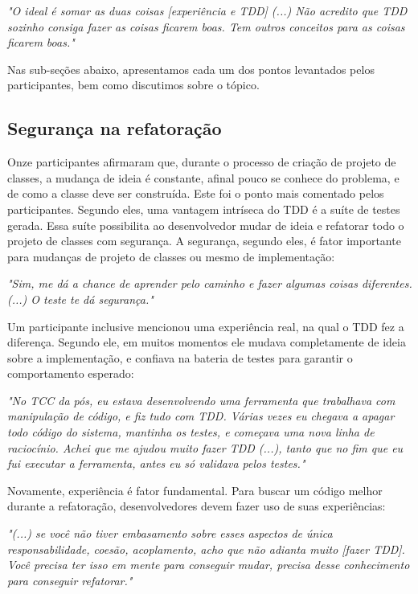 \begin{framed}
\textit{"O ideal é somar as duas coisas [experiência e TDD] (...) 
Não acredito que TDD sozinho consiga fazer as coisas ficarem boas. Tem outros conceitos
para as coisas ficarem boas."}
\end{framed}

Nas sub-seções abaixo, apresentamos cada um dos pontos 
levantados pelos participantes, bem como discutimos sobre o tópico.

\subsection{Segurança na refatoração}

Onze participantes afirmaram que, durante o processo de criação de projeto de classes, a mudança de ideia é
constante, afinal pouco se conhece do problema, e de como a classe deve ser construída. Este foi o ponto
mais comentado pelos participantes. Segundo eles,
uma vantagem intríseca do TDD é a suíte de testes gerada. Essa suíte possibilita ao desenvolvedor
mudar de ideia e refatorar todo o projeto de classes com segurança.
A segurança, segundo eles, é fator importante para mudanças de projeto de classes ou mesmo de implementação:

\begin{framed}
\textit{"Sim, me dá a chance de aprender pelo caminho e fazer algumas coisas diferentes. (...) O teste te dá segurança."}
\end{framed}

Um participante inclusive mencionou uma experiência real, na qual o TDD fez a diferença. Segundo ele,
em muitos momentos ele mudava completamente de ideia sobre a implementação, e confiava na bateria
de testes para garantir o comportamento esperado:

\begin{framed}
\textit{"No TCC da pós, eu estava desenvolvendo uma ferramenta que trabalhava com manipulação de código, e fiz
tudo com TDD. Várias vezes eu chegava a apagar todo código do sistema, mantinha os testes, e começava uma nova
linha de raciocínio. Achei que me ajudou muito fazer TDD (...), tanto que no fim que eu fui executar a ferramenta,
antes eu só validava pelos testes."}
\end{framed}

Novamente, experiência é fator fundamental. Para buscar um código melhor durante a refatoração,
desenvolvedores devem fazer uso de suas experiências:

\begin{framed}
\textit{"(...) se você não tiver embasamento sobre esses aspectos de única responsabilidade,
coesão, acoplamento, acho que não adianta muito [fazer TDD]. Você precisa ter isso em mente
para conseguir mudar, precisa desse conhecimento para conseguir refatorar."}
\end{framed}

